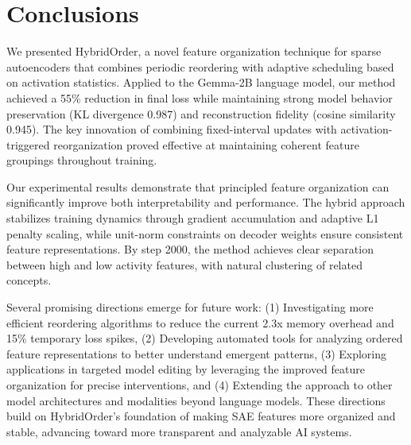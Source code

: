 \documentclass{article} %
\begin{document}
\section{Conclusions}
\label{sec:conclusion}

We presented HybridOrder, a novel feature organization technique for sparse autoencoders that combines periodic reordering with adaptive scheduling based on activation statistics. Applied to the Gemma-2B language model, our method achieved a 55\% reduction in final loss while maintaining strong model behavior preservation (KL divergence 0.987) and reconstruction fidelity (cosine similarity 0.945). The key innovation of combining fixed-interval updates with activation-triggered reorganization proved effective at maintaining coherent feature groupings throughout training.

Our experimental results demonstrate that principled feature organization can significantly improve both interpretability and performance. The hybrid approach stabilizes training dynamics through gradient accumulation and adaptive L1 penalty scaling, while unit-norm constraints on decoder weights ensure consistent feature representations. By step 2000, the method achieves clear separation between high and low activity features, with natural clustering of related concepts.

Several promising directions emerge for future work: (1) Investigating more efficient reordering algorithms to reduce the current 2.3x memory overhead and 15\% temporary loss spikes, (2) Developing automated tools for analyzing ordered feature representations to better understand emergent patterns, (3) Exploring applications in targeted model editing by leveraging the improved feature organization for precise interventions, and (4) Extending the approach to other model architectures and modalities beyond language models. These directions build on HybridOrder's foundation of making SAE features more organized and stable, advancing toward more transparent and analyzable AI systems.



\end{document}
